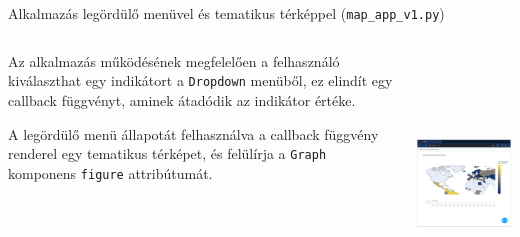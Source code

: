 \documentclass[english, aspectratio=169]{beamer}
\begin{document}
	\begin{frame}[fragile]{Alkalmazás legördülő menüvel és tematikus térképpel (\texttt{map\_app\_v1.py})}
		\begin{columns}
			\begin{column}{.5\textwidth}
				Az alkalmazás működésének megfelelően a felhasználó kiválaszthat egy indikátort a \texttt{Dropdown} menüből, ez elindít egy callback függvényt, aminek átadódik az indikátor értéke.\par\smallskip
				A legördülő menü állapotát felhasználva a callback függvény renderel egy tematikus térképet, és felülírja a \texttt{Graph} komponens \texttt{figure} attribútumát.
			\end{column}
			\begin{column}{.5\textwidth}
				\begin{center}
					\includegraphics[width=7cm, height=7cm, keepaspectratio]{images/scatter_23.png}
				\end{center}
			\end{column}
		\end{columns}
	\end{frame}
	
\end{document}
